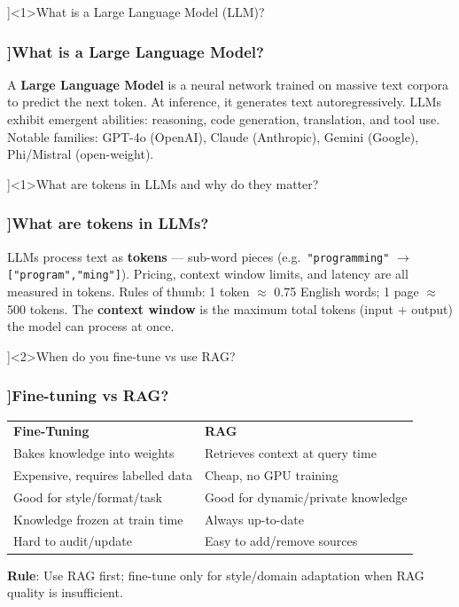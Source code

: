 
\QuestionSlide[\CategoryBadge[AiToolColor!20]{AI Tools \& LLMs}]<1>{What is a Large Language Model (LLM)?}

\begin{frame}[fragile]
  \frametitle{\AnswerTitle[\CategoryBadge[AiToolColor!20]{AI Tools \& LLMs}]{What is a Large Language Model?}}

  {\footnotesize
  A \textbf{Large Language Model} is a neural network trained on massive text corpora to predict the next token. At inference, it generates text autoregressively. LLMs exhibit emergent abilities: reasoning, code generation, translation, and tool use. Notable families: GPT-4o (OpenAI), Claude (Anthropic), Gemini (Google), Phi/Mistral (open-weight).
  }
\end{frame}

\QuestionSlide[\CategoryBadge[AiToolColor!20]{AI Tools \& LLMs}]<1>{What are tokens in LLMs and why do they matter?}

\begin{frame}[fragile]
  \frametitle{\AnswerTitle[\CategoryBadge[AiToolColor!20]{AI Tools \& LLMs}]{What are tokens in LLMs?}}

  {\footnotesize
  LLMs process text as \textbf{tokens} — sub-word pieces (e.g.\ \texttt{"programming"} $\to$ \texttt{["program","ming"]}). Pricing, context window limits, and latency are all measured in tokens. Rules of thumb: 1 token $\approx$ 0.75 English words; 1 page $\approx$ 500 tokens. The \textbf{context window} is the maximum total tokens (input + output) the model can process at once.
  }
\end{frame}

\QuestionSlide[\CategoryBadge[AiToolColor!20]{AI Tools \& LLMs}]<2>{When do you fine-tune vs use RAG?}

\begin{frame}[fragile]
  \frametitle{\AnswerTitle[\CategoryBadge[AiToolColor!20]{AI Tools \& LLMs}]{Fine-tuning vs RAG?}}

  {\footnotesize
  \begin{tabular}{ll}
    \textbf{Fine-Tuning} & \textbf{RAG} \\
    Bakes knowledge into weights & Retrieves context at query time \\
    Expensive, requires labelled data & Cheap, no GPU training \\
    Good for style/format/task & Good for dynamic/private knowledge \\
    Knowledge frozen at train time & Always up-to-date \\
    Hard to audit/update & Easy to add/remove sources \\
  \end{tabular}
  \vspace{0.5em}
  \textbf{Rule}: Use RAG first; fine-tune only for style/domain adaptation when RAG quality is insufficient.
  }
\end{frame}

